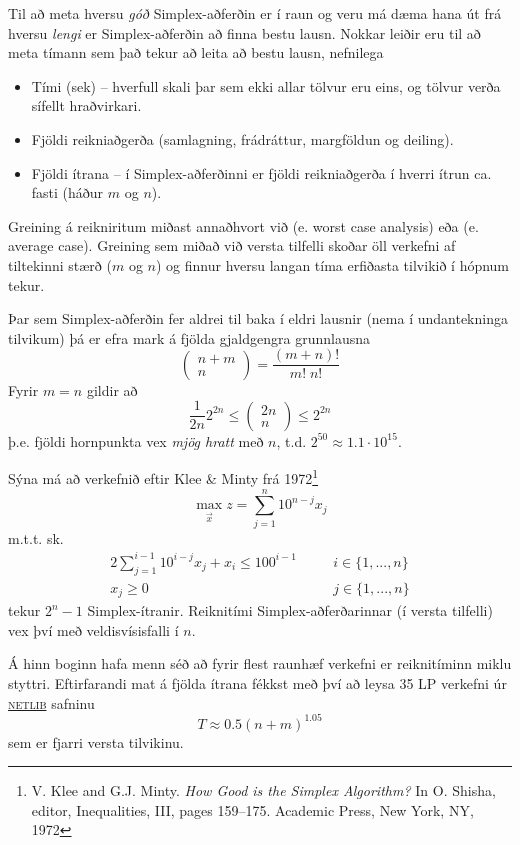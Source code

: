 Til að meta hversu \emph{góð} Simplex-aðferðin er í raun og veru má dæma hana út frá hversu \emph{lengi} er Simplex-aðferðin að finna bestu lausn. Nokkar leiðir eru til að meta tímann sem það tekur að leita að bestu lausn, nefnilega
\begin{itemize}
 \item Tími (sek) -- hverfull skali þar sem ekki allar tölvur eru eins, og tölvur verða sífellt hraðvirkari.
 \item Fjöldi reikniaðgerða (samlagning, frádráttur, margföldun og deiling).
 \item Fjöldi ítrana -- í Simplex-aðferðinni er fjöldi reikniaðgerða í hverri ítrun ca. fasti (háður $m$ og $n$).
\end{itemize}
Greining á reikniritum miðast annaðhvort við  (e. worst case analysis) eða  (e. average case).
Greining sem miðað við versta tilfelli skoðar öll verkefni af tiltekinni stærð ($m$ og $n$) og finnur hversu langan tíma erfiðasta tilvikið í hópnum tekur.

Þar sem Simplex-aðferðin fer aldrei til baka í eldri lausnir (nema í undantekninga tilvikum) þá er efra mark á fjölda gjaldgengra grunnlausna $$ \left(\begin{array}{c}n+m\\n\end{array}\right)=\frac{(m+n)!}{m!\;n!}$$
Fyrir $m=n$ gildir að 
$$ \frac{1}{2n}2^{2n}\leq \left(\begin{array}{c}2n\\n\end{array}\right) \leq 2^{2n} $$
þ.e. fjöldi hornpunkta vex \emph{mjög hratt} með $n$, t.d. $2^{50}\approx 1.1\cdot 10^{15}$.

Sýna má að verkefnið eftir Klee \& Minty\label{klee-minty} frá 1972\footnote{V. Klee and G.J. Minty. \emph{How Good is the Simplex Algorithm?} In O. Shisha, editor, Inequalities, III, pages 159–175. Academic Press, New York, NY, 1972}
$$ \max_{\vec{x}} z=\sum_{j=1}^n 10^{n-j} x_j $$
m.t.t. sk.
\begin{eqnarray*}
 2\sum_{j=1}^{i-1} 10^{i-j}x_j+x_i \leq 100^{i-1} &\quad& i\in\{1,...,n\} \\
 x_j\geq0 &\quad& j\in\{1,...,n\}
\end{eqnarray*}
tekur $2^n-1$ Simplex-ítranir. Reiknitími Simplex-aðferðarinnar (í versta tilfelli) vex því með veldisvísisfalli í $n$.

Á hinn boginn hafa menn séð að fyrir flest raunhæf verkefni er reiknitíminn miklu styttri. Eftirfarandi mat á fjölda ítrana fékkst með því að leysa 35 LP verkefni úr \href{http://www.netlib.org/}{\textsc{netlib}} safninu
$$ T\approx 0.5(n+m)^{1.05} $$
sem er fjarri versta tilvikinu.

